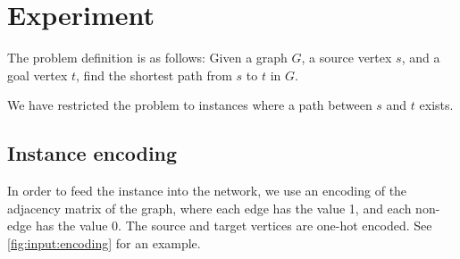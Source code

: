 
\section{Experiment}
The problem definition is as follows: 
Given a graph $G$, a source vertex $s$, and a goal vertex $t$, find the shortest path from $s$ to $t$ in $G$.

\newpar We have restricted the problem to instances where a path between $s$ and $t$ exists.

\subsection{Instance encoding}
In order to feed the instance into the network, we use an encoding of the adjacency matrix of the graph, where each edge has the value 1, and each non-edge has the value 0. The source and target vertices are one-hot encoded. See \autoref{fig:input:encoding} for an example.

